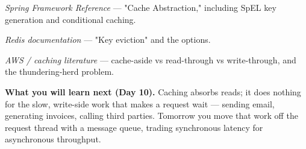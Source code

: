 \begin{wbitem}
  \item \emph{Spring Framework Reference} --- "Cache Abstraction," including SpEL key generation and conditional caching.
  \item \emph{Redis documentation} --- "Key eviction" and the  options.
  \item \emph{AWS / caching literature} --- cache-aside vs read-through vs write-through, and the thundering-herd problem.
\end{wbitem}

\begin{keyidea}
\textbf{What you will learn next (Day 10).} Caching absorbs reads; it does nothing for the slow, write-side work that makes a request wait --- sending email, generating invoices, calling third parties. Tomorrow you move that work off the request thread with a message queue, trading synchronous latency for asynchronous throughput.
\end{keyidea}

